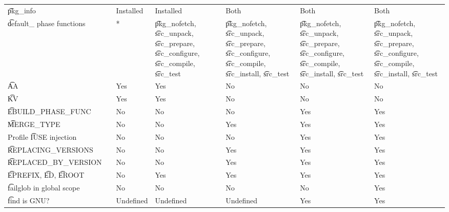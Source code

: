 \begin{landscape}
\begin{longtable}{llP{7.5em}P{7.5em}P{7.5em}P{7.5em}P{7.5em}}
\t{pkg\_info} &  &
    Installed & Installed & Both & Both & Both \\

\t{default\_} phase functions &  &
    * &
    \t{pkg\_nofetch}, \t{src\_unpack}, \t{src\_prepare}, \t{src\_configure},
        \t{src\_compile}, \t{src\_test} &
    \t{pkg\_nofetch}, \t{src\_unpack}, \t{src\_prepare}, \t{src\_configure},
        \t{src\_compile}, \t{src\_install}, \t{src\_test} &
    \t{pkg\_nofetch}, \t{src\_unpack}, \t{src\_prepare}, \t{src\_configure},
        \t{src\_compile}, \t{src\_install}, \t{src\_test} &
    \t{pkg\_nofetch}, \t{src\_unpack}, \t{src\_prepare}, \t{src\_configure},
        \t{src\_compile}, \t{src\_install}, \t{src\_test} \\

\t{AA} &  &
    Yes & Yes & No & No & No \\

\t{KV} &  &
    Yes & Yes & No & No & No \\

\t{EBUILD\_PHASE\_FUNC} &  &
    No & No & No & Yes & Yes \\

\t{MERGE\_TYPE} &  &
    No & No & Yes & Yes & Yes \\

Profile \t{IUSE} injection &  &
    No & No & No & Yes & Yes \\

\t{REPLACING\_VERSIONS} &  &
    No & No & Yes & Yes & Yes \\

\t{REPLACED\_BY\_VERSION} &  &
    No & No & Yes & Yes & Yes \\

\t{EPREFIX}, \t{ED}, \t{EROOT} &  &
    No & Yes & Yes & Yes & Yes \\

\t{failglob} in global scope &  &
    No & No & No & No & Yes \\

\t{find} is GNU? &  &
    Undefined & Undefined & Undefined & Yes & Yes \\


\end{longtable}
\end{landscape}
